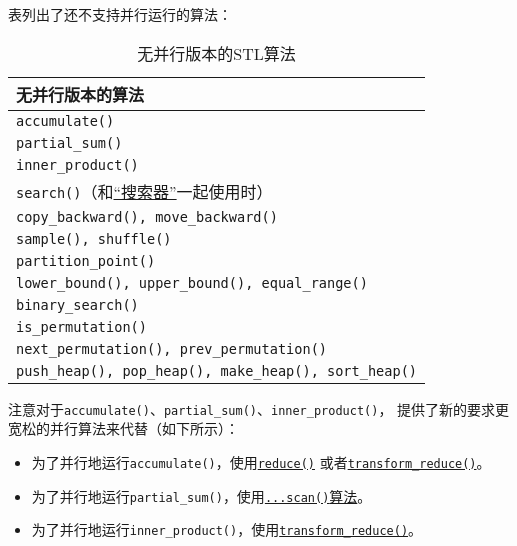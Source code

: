 表列出了还不支持并行运行的算法：
\begin{table}[htb]
    \centering
    \begin{tabular}{l}
        \hline
        \textbf{无并行版本的算法}                                              \\
        \hline
        \texttt{accumulate()}                                          \\
        \texttt{partial\_sum()}                                        \\
        \texttt{inner\_product()}                                      \\
        \texttt{search()}（和\hyperref[ch24]{“搜索器”}一起使用时）                \\
        \texttt{copy\_backward(), move\_backward()}                    \\
        \texttt{sample(), shuffle()}                                   \\
        \texttt{partition\_point()}                                    \\
        \texttt{lower\_bound(), upper\_bound(), equal\_range()}        \\
        \texttt{binary\_search()}                                      \\
        \texttt{is\_permutation()}                                     \\
        \texttt{next\_permutation(), prev\_permutation()}              \\
        \texttt{push\_heap(), pop\_heap(), make\_heap(), sort\_heap()} \\
        \hline
    \end{tabular}
    \caption{无并行版本的STL算法}
    \label{t22.3}
\end{table}

注意对于\texttt{accumulate()}、\texttt{partial\_sum()}、\texttt{inner\_product()}，
提供了新的要求更宽松的并行算法来代替（如下所示）：
\begin{itemize}
    \item 为了并行地运行\texttt{accumulate()}，使用\hyperref[ch23.2.1]{\texttt{reduce()}}
    或者\hyperref[ch23.2.2]{\texttt{transform\_reduce()}}。
    \item 为了并行地运行\texttt{partial\_sum()}，使用\hyperref[ch23.2.3]{\texttt{...scan()}算法}。
    \item 为了并行地运行\texttt{inner\_product()}，使用\hyperref[ch23.2.2.2]{\texttt{transform\_reduce()}}。
\end{itemize}

